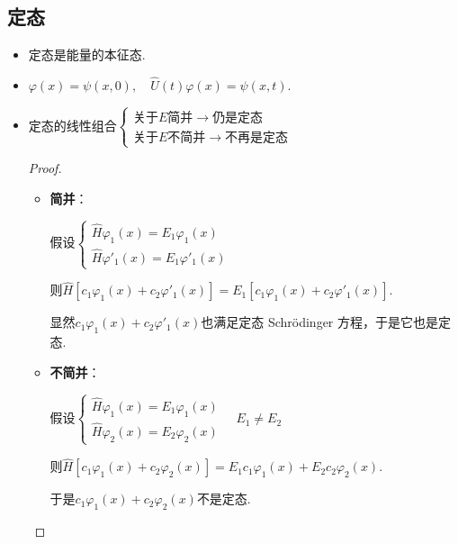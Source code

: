 \subsection{定态}
\begin{itemize}
    \item 定态是能量的本征态.
    \item $\varphi(x) = \psi(x,0), \quad \hat{U}(t)\varphi(x)=\psi(x,t)$.
    \item 定态的线性组合$\begin{cases}
        \text{关于$E$简并$\rightarrow$仍是定态} \\
        \text{关于$E$不简并$\rightarrow$不再是定态}
    \end{cases}$

    \begin{proof}
    \begin{itemize}
        \item \textbf{简并}：

        假设$\begin{cases}
            \hat{H}\varphi_1(x)=E_1 \varphi_1(x) \\
            \hat{H}\varphi'_1(x)=E_1 \varphi'_1(x)
        \end{cases}$

        则$\hat{H}\left[c_1\varphi_1(x) + c_2\varphi'_1(x)\right]=E_1\left[c_1\varphi_1(x) + c_2\varphi'_1(x)\right]$.

        显然$c_1\varphi_1(x) + c_2\varphi'_1(x)$也满足定态 Schrödinger 方程，于是它也是定态.

        \item \textbf{不简并}：
        
        假设$\begin{cases}
            \hat{H}\varphi_1(x)=E_1 \varphi_1(x) \\
            \hat{H}\varphi_2(x)=E_2 \varphi_2(x)
        \end{cases}\quad E_1 \neq E_2$

        则$\hat{H}\left[c_1\varphi_1(x) + c_2\varphi_2(x)\right]=E_1 c_1 \varphi_1(x) + E_2 c_2 \varphi_2(x)$.

        于是$c_1\varphi_1(x) + c_2\varphi_2(x)$不是定态.
    \end{itemize}
    \end{proof}


\end{itemize}
